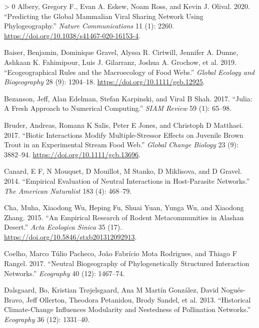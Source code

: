 \documentclass[11pt]{article}
\newlength{\cslhangindent}
\newenvironment{CSLReferences}[3] %
 {%
  \setlength{\parindent}{0pt}
  \ifodd #1 \everypar{\setlength{\hangindent}{\cslhangindent}}\ignorespaces\fi
  \ifnum #2 > 0
  \setlength{\parskip}{#2\baselineskip}
  \fi
 }%
 {}
\begin{document}
\hypertarget{refs}{}
\begin{CSLReferences}{1}{0}
\leavevmode\hypertarget{ref-Albery2020PreGlo}{}%
Albery, Gregory F., Evan A. Eskew, Noam Ross, and Kevin J. Olival. 2020.
{``Predicting the Global Mammalian Viral Sharing Network Using
Phylogeography.''} \emph{Nature Communications} 11 (1): 2260.
\url{https://doi.org/10.1038/s41467-020-16153-4}.

\leavevmode\hypertarget{ref-Baiser2019EcoRul}{}%
Baiser, Benjamin, Dominique Gravel, Alyssa R. Cirtwill, Jennifer A.
Dunne, Ashkaan K. Fahimipour, Luis J. Gilarranz, Joshua A. Grochow, et
al. 2019. {``Ecogeographical Rules and the Macroecology of Food Webs.''}
\emph{Global Ecology and Biogeography} 28 (9): 1204--18.
\url{https://doi.org/10.1111/geb.12925}.

\leavevmode\hypertarget{ref-Bezanson2017JulFre}{}%
Bezanson, Jeff, Alan Edelman, Stefan Karpinski, and Viral B Shah. 2017.
{``Julia: A Fresh Approach to Numerical Computing.''} \emph{SIAM Review}
59 (1): 65--98.

\leavevmode\hypertarget{ref-Bruder2017BioInt}{}%
Bruder, Andreas, Romana K Salis, Peter E Jones, and Christoph D
Matthaei. 2017. {``Biotic Interactions Modify Multiple-Stressor Effects
on Juvenile Brown Trout in an Experimental Stream Food Web.''}
\emph{Global Change Biology} 23 (9): 3882--94.
\url{https://doi.org/10.1111/gcb.13696}.

\leavevmode\hypertarget{ref-Canard2014EmpEva}{}%
Canard, E F, N Mouquet, D Mouillot, M Stanko, D Miklisova, and D Gravel.
2014. {``Empirical Evaluation of Neutral Interactions in Host-Parasite
Networks.''} \emph{The American Naturalist} 183 (4): 468--79.

\leavevmode\hypertarget{ref-CHAMuha2015EmpRes}{}%
Cha, Muha, Xiaodong Wu, Heping Fu, Shuai Yuan, Yunga Wu, and Xiaodong
Zhang. 2015. {``An Empirical Research of Rodent Metacommunities in
Alashan Desert.''} \emph{Acta Ecologica Sinica} 35 (17).
\url{https://doi.org/10.5846/stxb201312092913}.

\leavevmode\hypertarget{ref-Coelho2017NeuBio}{}%
Coelho, Marco Túlio Pacheco, João Fabrício Mota Rodrigues, and Thiago F
Rangel. 2017. {``Neutral Biogeography of Phylogenetically Structured
Interaction Networks.''} \emph{Ecography} 40 (12): 1467--74.

\leavevmode\hypertarget{ref-Dalsgaard2013HisCli}{}%
Dalsgaard, Bo, Kristian Trøjelsgaard, Ana M Martín González, David
Nogués-Bravo, Jeff Ollerton, Theodora Petanidou, Brody Sandel, et al.
2013. {``Historical Climate-Change Influences Modularity and Nestedness
of Pollination Networks.''} \emph{Ecography} 36 (12): 1331--40.


\end{CSLReferences}
\end{document}
